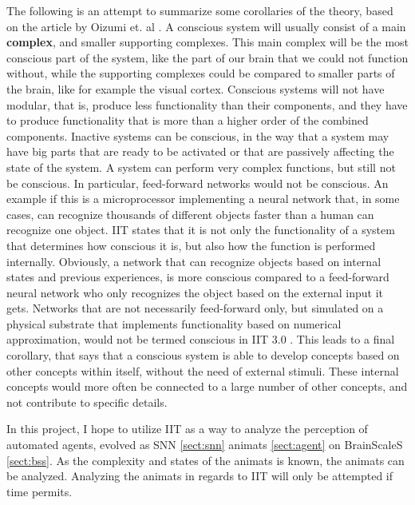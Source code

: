 The following is an attempt to summarize some corollaries of the theory, based on the article by Oizumi et. al \cite{oizumi_phenomenology_2014}.
A conscious system will usually consist of a main \textbf{complex}, and smaller supporting complexes.
This main complex will be the most conscious part of the system, like the part of our brain that we could not function without, while the supporting complexes could be compared to smaller parts of the brain, like for example the visual cortex.
Conscious systems will not have modular, that is, produce less functionality than their components, and they have to produce functionality that is more than a higher order of the combined components.
Inactive systems can be conscious, in the way that a system may have big parts that are ready to be activated or that are passively affecting the state of the system.
A system can perform very complex functions, but still not be conscious.
In particular, feed-forward networks would not be conscious.
An example if this is a microprocessor implementing a neural network that, in some cases, can recognize thousands of different objects faster than a human can recognize one object.
IIT states that it is not only the functionality of a system that determines how conscious it is, but also how the function is performed internally.
Obviously, a network that can recognize objects based on internal states and previous experiences, is more conscious compared to a feed-forward neural network who only recognizes the object based on the external input it gets.
Networks that are not necessarily feed-forward only, but simulated on a physical substrate that implements functionality based on numerical approximation, would not be termed conscious in IIT 3.0 \cite{marshall_integrated_2016}.
This leads to a final corollary, that says that a conscious system is able to develop concepts based on other concepts within itself, without the need of external stimuli.
These internal concepts would more often be connected to a large number of other concepts, and not contribute to specific details.

In this project, I hope to utilize IIT as a way to analyze the perception of automated agents, evolved as SNN \vref{sect:snn} animats \vref{sect:agent} on BrainScaleS \vref{sect:bss}.
As the complexity and states of the animats is known, the animats can be analyzed.
Analyzing the animats in regards to IIT will only be attempted if time permits.
